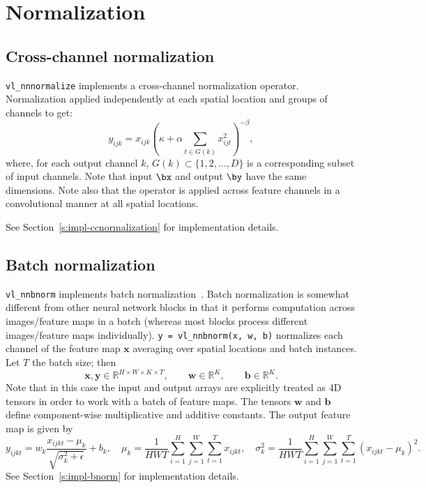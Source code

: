 \section{Normalization}\label{s:normalization}

\subsection{Cross-channel normalization}\label{s:ccnormalization}

\verb!vl_nnnormalize! implements a cross-channel normalization operator. Normalization applied independently at each spatial location and groups of channels to get:
\[
 y_{ijk} = x_{ijk} \left( \kappa + \alpha \sum_{t\in G(k)} x_{ijt}^2 \right)^{-\beta},
\]
where, for each output channel $k$, $G(k) \subset \{1, 2, \dots, D\}$ is a corresponding subset of input channels. Note that input $\bx$ and output $\by$ have the same dimensions. Note also that the operator is applied across feature channels in a convolutional manner at all spatial locations.

See Section~\ref{s:impl-ccnormalization} for implementation details.

\subsection{Batch normalization}\label{s:bnorm}

\verb!vl_nnbnorm! implements batch normalization~\cite{ioffe2015}. Batch normalization is somewhat different from other neural network blocks in that it performs computation across images/feature maps in a batch (whereas most blocks process different images/feature maps individually). \verb!y = vl_nnbnorm(x, w, b)! normalizes each channel of the feature map $\mathbf{x}$ averaging over spatial locations and batch instances. Let $T$ the batch size; then
\[
\mathbf{x}, \mathbf{y} \in \mathbb{R}^{H \times W \times K \times T},
\qquad\mathbf{w} \in \mathbb{R}^{K},
\qquad\mathbf{b} \in \mathbb{R}^{K}.
\]
Note that in this case the input and output arrays are explicitly treated as 4D tensors in order to work with a batch of feature maps. The tensors  $\mathbf{w}$ and $\mathbf{b}$ define component-wise multiplicative and additive constants. The output feature map is given by
\[
y_{ijkt} = w_k \frac{x_{ijkt} - \mu_{k}}{\sqrt{\sigma_k^2 + \epsilon}} + b_k,
\quad
\mu_{k} = \frac{1}{HWT}\sum_{i=1}^H \sum_{j=1}^W \sum_{t=1}^{T} x_{ijkt},
\quad
\sigma^2_{k} = \frac{1}{HWT}\sum_{i=1}^H \sum_{j=1}^W \sum_{t=1}^{T} (x_{ijkt} - \mu_{k})^2.
\]
See Section~\ref{s:impl-bnorm} for implementation details.

